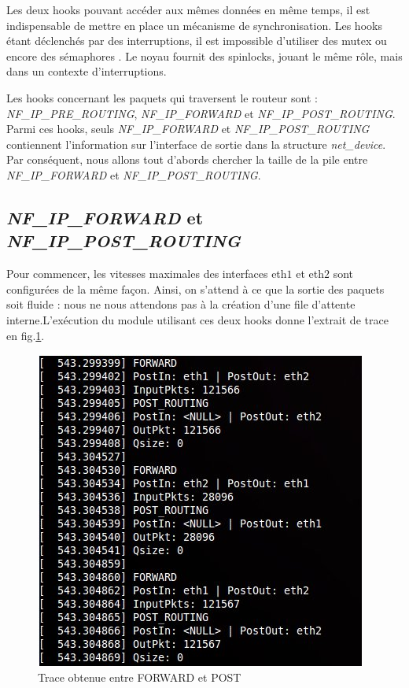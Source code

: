 \documentclass[a4paper]{article}
\begin{document}
Les deux hooks pouvant accéder aux mêmes données en même temps,
il est indispensable de mettre en place un mécanisme de
synchronisation. Les hooks étant déclenchés par des interruptions,
il est impossible d'utiliser des mutex ou encore des sémaphores \cite{mutex}.
Le noyau fournit des spinlocks, jouant le même rôle, mais dans
un contexte d'interruptions. \cite{lock}

Les hooks concernant les paquets qui traversent le routeur sont :
\textit{NF\_IP\_PRE\_ROUTING}, \textit{NF\_IP\_FORWARD} et
\textit{NF\_IP\_POST\_ROUTING}. Parmi ces hooks, seuls
\textit{NF\_IP\_FORWARD} et \textit{NF\_IP\_POST\_ROUTING}
contiennent l'information sur l'interface de sortie dans la
structure \textit{net\_device}. Par conséquent, nous allons
tout d'abords chercher la taille de la pile entre
\textit{NF\_IP\_FORWARD} et \textit{NF\_IP\_POST\_ROUTING}.

\subsection{\textit{NF\_IP\_FORWARD} et \textit{NF\_IP\_POST\_ROUTING}}
Pour commencer, les vitesses maximales des interfaces eth$1$ et
eth$2$ sont configurées de la même façon. Ainsi, on s'attend à
ce que la sortie des paquets soit fluide : nous ne nous attendons
pas à la création d'une file d'attente interne.L'exécution du module
utilisant ces deux hooks donne l'extrait de trace en
fig.\ref{forwardpost}.

\begin{figure}
	\centering
	\includegraphics[scale=.5]{forward_post.jpg}
	\caption{\label{forwardpost} Trace obtenue entre FORWARD et POST}
\end{figure}
\end{document}
